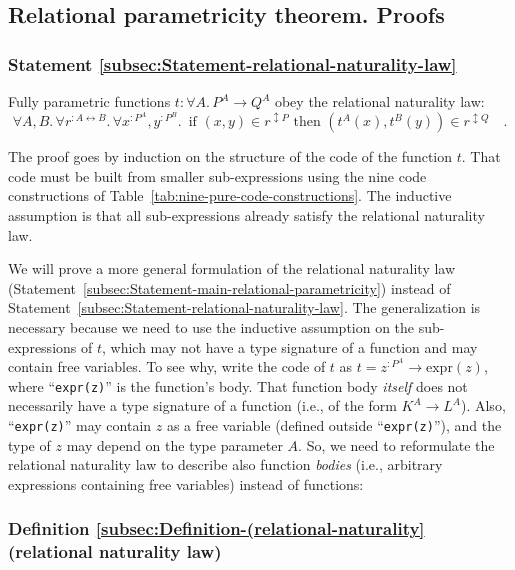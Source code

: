 \subsection{Relational parametricity theorem. Proofs}

\subsubsection{Statement \label{subsec:Statement-relational-naturality-law}\ref{subsec:Statement-relational-naturality-law}}

Fully parametric functions $t:\forall A.\,P^{A}\rightarrow Q^{A}$
obey the relational naturality law:
\[
\forall A,B.\,\forall r^{:A\leftrightarrow B}.\,\forall x^{:P^{A}},y^{:P^{B}}.\,\text{ if }(x,y)\in r^{\updownarrow P}\text{ then }(t^{A}(x),t^{B}(y))\in r^{\updownarrow Q}\quad.
\]

The proof goes by induction on the structure of the code of the function
$t$. That code must be built from smaller sub-expressions using the
nine code constructions of Table~\ref{tab:nine-pure-code-constructions}.
The inductive assumption is that all sub-expressions already satisfy
the relational naturality law.

We will prove a more general formulation of the relational naturality
law (Statement~\ref{subsec:Statement-main-relational-parametricity})
instead of Statement~\ref{subsec:Statement-relational-naturality-law}.
The generalization is necessary because we need to use the inductive
assumption on the sub-expressions of $t$, which may not have a type
signature of a function and may contain free variables. To see why,
write the code of $t$ as $t=z^{:P^{A}}\rightarrow\text{expr}(z)$,
 where \textsf{``}\lstinline!expr(z)!\textsf{''} is the function\textsf{'}s body. That function
body \emph{itself} does not necessarily have a type signature of a
function (i.e., of the form $K^{A}\rightarrow L^{A}$). Also, \textsf{``}\lstinline!expr(z)!\textsf{''}
may contain $z$ as a free variable (defined outside \textsf{``}\lstinline!expr(z)!\textsf{''}),
and the type of $z$ may depend on the type parameter $A$. So, we
need to reformulate the relational naturality law to describe also
function \emph{bodies} (i.e., arbitrary expressions containing free
variables) instead of functions:

\subsubsection{Definition \label{subsec:Definition-(relational-naturality}\ref{subsec:Definition-(relational-naturality}
(relational naturality law)}

